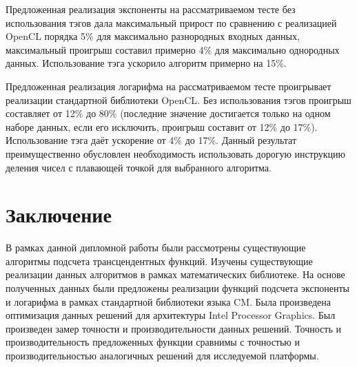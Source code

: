 Предложенная реализация экспоненты на рассматриваемом тесте без использования тэгов дала максимальный прирост по сравнению с реализацией OpenCL порядка 5\% для максимально разнородных входных данных, максимальный проигрыш составил примерно 4\% для максимально однородных данных.
Использование тэга ускорило алгоритм примерно на 15\%.

Предложенная реализация логарифма на рассматриваемом тесте проигрывает реализации стандартной библиотеки OpenCL.
Без использования тэгов проигрыш составляет от 12\% до 80\% (последние значение достигается только на одном наборе данных, если его исключить, проигрыш составит от 12\% до 17\%).
Использование тэга даёт ускорение от 4\% до 17\%.
Данный результат преимущественно обусловлен необходимость использовать дорогую инструкцию деления чисел с плавающей точкой для выбранного алгоритма.

\chapter{Заключение}

В рамках данной дипломной работы были рассмотрены существующие алгоритмы подсчета трансцендентных функций.
Изучены существующие реализации данных алгоритмов в рамках математических библиотеке.
На основе полученных данных были предложены реализации функций подсчета экспоненты и логарифма в рамках стандартной библиотеки языка CM.
Была произведена оптимизация данных решений для архитектуры \foreignlanguage{english}{Intel Processor Graphics}.
Был произведен замер точности и производительности данных решений.
Точность и производительность предложенных функции сравнимы с точностью и производительностью аналогичных решений для исследуемой платформы.

